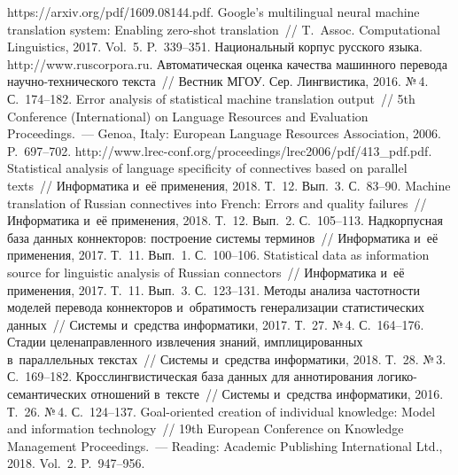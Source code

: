 \begin{multicols}{2}
{{\begin{thebibliography}{99}
{https://arxiv.org/pdf/1609.08144.pdf}.
 Google's 
multilingual neural machine translation system: Enabling zero-shot translation~// 
T.~Assoc. Computational Linguistics, 2017. Vol.~5. P.~339--351.
Национальный корпус русского языка. {\sf http://\linebreak www.ruscorpora.ru}.
 Автоматическая оценка качества машинного перевода  
на\-уч\-но-тех\-ни\-че\-ско\-го текста~// Вестник МГОУ. Сер. Лингвистика, 2016. №\,4. 
С.~174--182.
 Error analysis of statistical machine translation output~// 
5th Conference (International) on Language Resources and Evaluation Proceedings.~--- Genoa, 
Italy: European Language Resources Association, 2006. P.~697--702. 
{\sf http://www.lrec-conf.org/proceedings/lrec2006/pdf/413\_pdf.pdf}.
 Statistical analysis of language specificity of connectives 
based on parallel texts~// Информатика и~её применения, 2018. Т.~12. Вып.~3. С.~83--90.
 Machine translation of Russian connectives into French: 
Errors and quality failures~// Информатика и~её применения, 2018. Т.~12. Вып.~2. С.~105--113.
 Надкорпусная база данных 
коннекторов: построение сис\-те\-мы терминов~// Информатика и~её применения, 2017. Т.~11. 
Вып.~1. С.~100--106.
 Statistical data as information source for linguistic analysis of 
Russian connectors~// Информатика и~её применения, 2017. Т.~11. Вып.~3. С.~123--131.
 Методы анализа частотности моделей 
перевода коннекторов и~обратимость генерализации статистических данных~// Системы 
и~средства информатики, 2017. Т.~27. №\,4. С.~164--176.
 Стадии целенаправленного извлечения знаний, имплицированных 
в~параллельных текстах~// Системы и~средства информатики, 2018. Т.~28. №\,3.  
С.~169--182.
 Кросс\-лингвистическая база данных для 
аннотирования ло\-ги\-ко-се\-ман\-ти\-че\-ских отношений в~тексте~// Системы и~средства 
информатики, 2016. Т.~26. №\,4. С.~124--137.
 Goal-oriented creation of individual knowledge: Model and information 
technology~// 19th European Conference on Knowledge Management Proceedings.~--- Reading: 
Academic Publishing International Ltd., 2018. Vol.~2. P.~947--956.
 \end{thebibliography}

 }
 }

\end{multicols}

